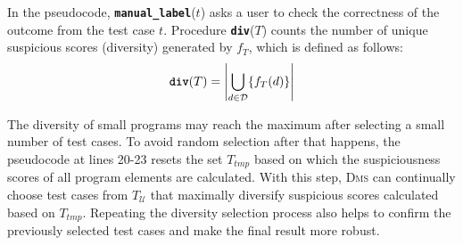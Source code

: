 

In the pseudocode, \texttt{\textbf{manual\_label}}($t$) asks a user to check
the correctness of the outcome from the test case $t$. Procedure \texttt{\textbf{div}}($T$)
counts the number of unique suspicious scores (diversity) generated by $f_T$, which is defined as follows:
\begin{equation}
	\texttt{\textbf{div}}(T) = \left| \bigcup\limits_{d \in \mathcal{D}} \{f_{T}(d)\} \right|
\end{equation}

The diversity of small programs may reach the maximum after selecting a small number of test cases. To avoid random selection
after that happens, the pseudocode at lines 20-23 resets the set $T_{tmp}$
based on which the suspiciousness scores of all program elements are calculated. With this step, \textsc{Dms} can
continually choose test cases from $T_{\mathcal{U}}$ that maximally diversify suspicious scores calculated based on $T_{tmp}$.
Repeating the diversity selection process also helps to confirm the previously selected test cases and make the final result more robust.





